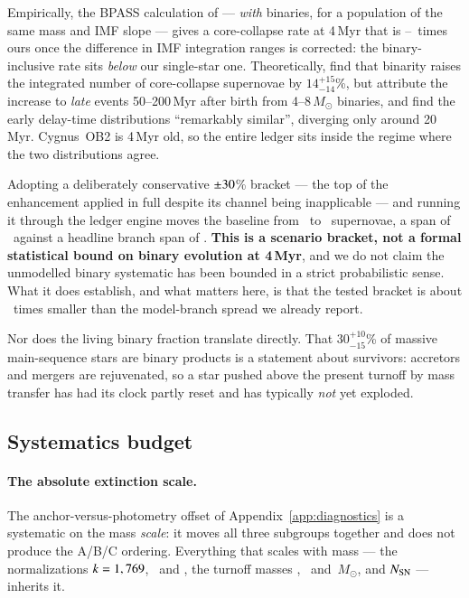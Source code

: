 \documentclass{aa}
\begin{document}
Empirically, the BPASS \citep{stanway2018} calculation of \citet{harer2025} ---
\emph{with} binaries, for a population of the same mass and IMF slope --- gives a
core-collapse rate at 4\,Myr that is \bpassRatioLo--\bpassRatioHi\ times ours
once the difference in IMF integration ranges is corrected: the binary-inclusive
rate sits \emph{below} our single-star one. Theoretically,
\citet{zapartas2017} find that binarity raises the integrated number of
core-collapse supernovae by $14^{+15}_{-14}$\%, but attribute the increase to
\emph{late} events 50--200\,Myr after birth from 4--8\,$M_\odot$ binaries, and
find the early delay-time distributions ``remarkably similar'', diverging only
around 20\,Myr. Cygnus~OB2 is 4\,Myr old, so the entire ledger sits inside the
regime where the two distributions agree.

Adopting a deliberately conservative $\pm30$\% bracket --- the top of
the \citet{zapartas2017} enhancement applied in full despite its channel being
inapplicable --- and running it through the ledger engine moves the baseline from
\binaryLo\ to \binaryHi\ supernovae, a span of \binarySpan\ against a headline
branch span of \branchSpan. \textbf{This is a scenario bracket, not a formal
statistical bound on binary evolution at 4\,Myr}, and we do not claim the
unmodelled binary systematic has been bounded in a strict probabilistic sense.
What it does establish, and what matters here, is that the tested bracket is
about \binaryRatio\ times smaller than the model-branch spread we already
report.

Nor does the living binary fraction translate directly. That
$30^{+10}_{-15}$\% of massive main-sequence stars are binary products
\citep{demink2014} is a statement about survivors: accretors and mergers are
rejuvenated, so a star pushed above the present turnoff by mass transfer has had
its clock partly reset and has typically \emph{not} yet exploded.

\subsection{Systematics budget}\label{sec:systematics}

\paragraph{The absolute extinction scale.}
The anchor-versus-photometry offset of Appendix~\ref{app:diagnostics} is a
systematic on the mass \emph{scale}: it moves all three subgroups together and
does not produce the A/B/C ordering. Everything that scales with mass ---
the normalizations $k = 1,769$, \kB\ and \kC, the turnoff masses \turnoffA,
\turnoffB\ and \turnoffC\,$M_\odot$, and $N_{\rm SN}$ --- inherits it.
\end{document}
